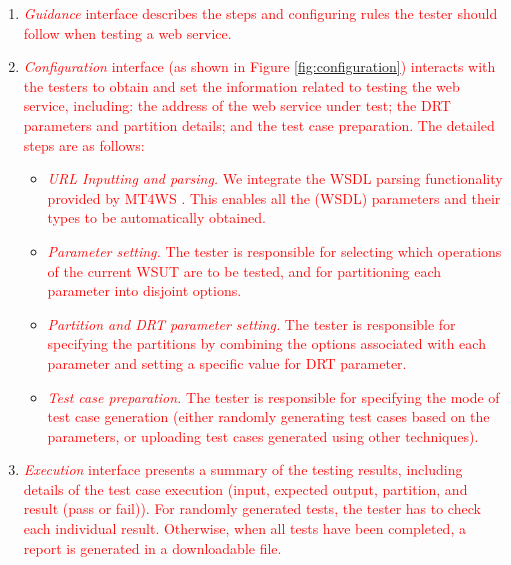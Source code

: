 \documentclass[10pt,journal,compsoc]{IEEEtran}
\begin{document}
\begin{enumerate}[1)]
  \item
  \textcolor{red}{\emph{Guidance} interface describes the steps and configuring rules the tester should follow when testing a web service.}

  \item
  \textcolor{red}{\emph{Configuration} interface (as shown in Figure \ref{fig:configuration}) interacts with the testers to obtain and set the information related to testing the web service, including: the address of the web service under test; the DRT parameters and partition details; and the test case preparation. The detailed steps are as follows:}

  \begin{itemize}
    \item
    \textcolor{red}{\emph{URL Inputting and parsing.} We integrate the WSDL parsing functionality provided by MT4WS \cite{sun2016mt4ws}. This enables all the (WSDL) parameters and their types to be automatically obtained.}
    \item
    \textcolor{red}{\emph{Parameter setting.} The tester is responsible for selecting which operations of the current WSUT are to be tested, and for partitioning each parameter into disjoint options.}
    \item
    \textcolor{red}{\emph{Partition and DRT parameter setting.} The tester is responsible for specifying the partitions by combining the options associated with each parameter and setting a specific value for DRT parameter.}
    \item
    \textcolor{red}{\emph{Test case preparation.} The tester is responsible for specifying the mode of test case generation (either randomly generating test cases based on the parameters, or uploading test cases generated using other techniques).}
  \end{itemize}
  \item
  \textcolor{red}{\emph{Execution} interface presents a summary of the testing results, including details of the test case execution (input, expected output, partition, and result (pass or fail)). For randomly generated tests, the tester has to check each individual result. Otherwise, when all tests have been completed, a report is generated in a downloadable file.}
\end{enumerate}
\end{document}
